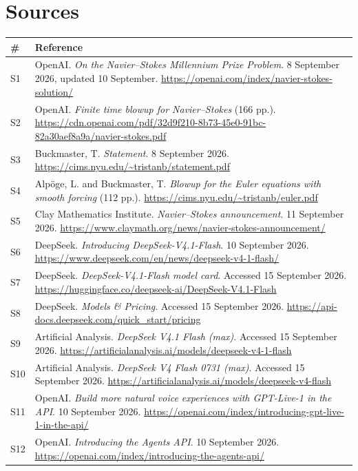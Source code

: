 \documentclass[11pt,a4paper]{article}
\begin{document}
\section{Sources}
{\footnotesize
\begin{tabularx}{\textwidth}{@{}l X@{}}
\toprule
\textbf{\#} & \textbf{Reference} \\
\midrule
S1 & OpenAI. \emph{On the Navier--Stokes Millennium Prize Problem}. 8 September 2026, updated 10 September. \url{https://openai.com/index/navier-stokes-solution/} \\
S2 & OpenAI. \emph{Finite time blowup for Navier--Stokes} (166 pp.). \url{https://cdn.openai.com/pdf/32d9f210-8b73-45e0-91bc-82a30aef8a9a/navier-stokes.pdf} \\
S3 & Buckmaster, T. \emph{Statement}. 8 September 2026. \url{https://cims.nyu.edu/~tristanb/statement.pdf} \\
S4 & Alp\"oge, L. and Buckmaster, T. \emph{Blowup for the Euler equations with smooth forcing} (112 pp.). \url{https://cims.nyu.edu/~tristanb/euler.pdf} \\
S5 & Clay Mathematics Institute. \emph{Navier--Stokes announcement}. 11 September 2026. \url{https://www.claymath.org/news/navier-stokes-announcement/} \\
S6 & DeepSeek. \emph{Introducing DeepSeek-V4.1-Flash}. 10 September 2026. \url{https://www.deepseek.com/en/news/deepseek-v4-1-flash/} \\
S7 & DeepSeek. \emph{DeepSeek-V4.1-Flash model card}. Accessed 15 September 2026. \url{https://huggingface.co/deepseek-ai/DeepSeek-V4.1-Flash} \\
S8 & DeepSeek. \emph{Models \& Pricing}. Accessed 15 September 2026. \url{https://api-docs.deepseek.com/quick_start/pricing} \\
S9 & Artificial Analysis. \emph{DeepSeek V4.1 Flash (max)}. Accessed 15 September 2026. \url{https://artificialanalysis.ai/models/deepseek-v4-1-flash} \\
S10 & Artificial Analysis. \emph{DeepSeek V4 Flash 0731 (max)}. Accessed 15 September 2026. \url{https://artificialanalysis.ai/models/deepseek-v4-flash} \\
S11 & OpenAI. \emph{Build more natural voice experiences with GPT-Live-1 in the API}. 10 September 2026. \url{https://openai.com/index/introducing-gpt-live-1-in-the-api/} \\
S12 & OpenAI. \emph{Introducing the Agents API}. 10 September 2026. \url{https://openai.com/index/introducing-the-agents-api/} \\

\end{tabularx}}
\end{document}

